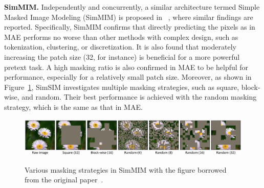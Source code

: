 \documentclass[10pt,journal,compsoc]{IEEEtran}
\begin{document}
\textbf{SimMIM.} Independently and concurrently, a similar architecture termed Simple Masked Image Modeling (SimMIM) is proposed in ~\cite{xie2022simmim}, where similar findings are reported. Specifically, SimMIM confirms that directly predicting the pixels as in MAE performs no worse than other methods with complex design, such as tokenization, clustering, or discretization. It is also found that moderately increasing the patch size (32, for instance) is beneficial for a more powerful pretext task. A high masking ratio is also confirmed in MAE to be helpful for performance, especially for a relatively small patch size. Moreover, as shown in Figure~\ref{fig:simmim}, SimSIM investigates multiple masking strategies, such as square, block-wise, and random. Their best performance is achieved with the random masking strategy, which is the same as that in MAE. 


\begin{figure}[!htbp]\centering
\includegraphics[width=.99\linewidth]{fig/masking_strategy.png}\\
\caption{Various masking strategies in SimMIM with the figure borrowed from the original paper~\cite{xie2022simmim}.
}
\label{fig:simmim}
\vspace{-1em}
\end{figure}
\end{document}
